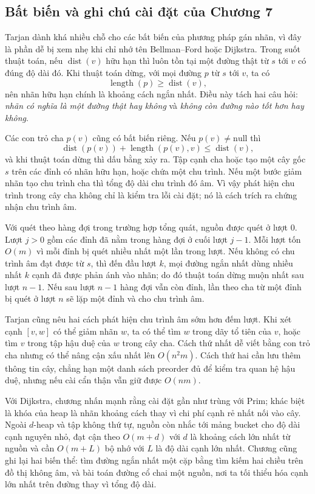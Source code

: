 \documentclass[11pt]{article}
\begin{document}
\subsection*{Bất biến và ghi chú cài đặt của Chương 7}

Tarjan dành khá nhiều chỗ cho các bất biến của phương pháp gán nhãn, vì đây là
phần dễ bị xem nhẹ khi chỉ nhớ tên Bellman--Ford hoặc Dijkstra. Trong suốt thuật
toán, nếu \(\operatorname{dist}(v)\) hữu hạn thì luôn tồn tại một đường thật từ
\(s\) tới \(v\) có đúng độ dài đó. Khi thuật toán dừng, với mọi đường \(p\) từ
\(s\) tới \(v\), ta có
\[
  \operatorname{length}(p)\ge \operatorname{dist}(v),
\]
nên nhãn hữu hạn chính là khoảng cách ngắn nhất. Điều này tách hai câu hỏi:
\emph{nhãn có nghĩa là một đường thật hay không} và \emph{không còn đường nào
tốt hơn hay không}.

Các con trỏ cha \(p(v)\) cũng có bất biến riêng. Nếu \(p(v)\ne\mathrm{null}\)
thì
\[
  \operatorname{dist}(p(v))+\operatorname{length}(p(v),v)
  \le \operatorname{dist}(v),
\]
và khi thuật toán dừng thì dấu bằng xảy ra. Tập cạnh cha hoặc tạo một cây gốc
\(s\) trên các đỉnh có nhãn hữu hạn, hoặc chứa một chu trình. Nếu một bước giảm
nhãn tạo chu trình cha thì tổng độ dài chu trình đó âm. Vì vậy phát hiện chu
trình trong cây cha không chỉ là kiểm tra lỗi cài đặt; nó là cách trích ra chứng
nhận chu trình âm.

Với quét theo hàng đợi trong trường hợp tổng quát, nguồn được quét ở lượt 0.
Lượt \(j>0\) gồm các đỉnh đã nằm trong hàng đợi ở cuối lượt \(j-1\). Mỗi lượt
tốn \(O(m)\) vì mỗi đỉnh bị quét nhiều nhất một lần trong lượt. Nếu không có
chu trình âm đạt được từ \(s\), thì đến đầu lượt \(k\), mọi đường ngắn nhất dùng
nhiều nhất \(k\) cạnh đã được phản ánh vào nhãn; do đó thuật toán dừng muộn nhất
sau lượt \(n-1\). Nếu sau lượt \(n-1\) hàng đợi vẫn còn đỉnh, lần theo cha từ
một đỉnh bị quét ở lượt \(n\) sẽ lặp một đỉnh và cho chu trình âm.

Tarjan cũng nêu hai cách phát hiện chu trình âm sớm hơn đếm lượt. Khi xét cạnh
\([v,w]\) có thể giảm nhãn \(w\), ta có thể tìm \(w\) trong dãy tổ tiên của
\(v\), hoặc tìm \(v\) trong tập hậu duệ của \(w\) trong cây cha. Cách thứ nhất
dễ viết bằng con trỏ cha nhưng có thể nâng cận xấu nhất lên \(O(n^2m)\). Cách
thứ hai cần lưu thêm thông tin cây, chẳng hạn một danh sách preorder đủ để kiểm
tra quan hệ hậu duệ, nhưng nếu cài cẩn thận vẫn giữ được \(O(nm)\).

Với Dijkstra, chương nhấn mạnh rằng cài đặt gần như trùng với Prim; khác biệt
là khóa của heap là nhãn khoảng cách thay vì chi phí cạnh rẻ nhất nối vào cây.
Ngoài \(d\)-heap và tập không thứ tự, nguồn còn nhắc tới mảng bucket cho độ dài
cạnh nguyên nhỏ, đạt cận theo \(O(m+d)\) với \(d\) là khoảng cách lớn nhất từ
nguồn và cần \(O(m+L)\) bộ nhớ với \(L\) là độ dài cạnh lớn nhất. Chương cũng
ghi lại hai biến thể: tìm đường ngắn nhất một cặp bằng tìm kiếm hai chiều trên
đồ thị không âm, và bài toán đường cổ chai một nguồn, nơi ta tối thiểu hóa cạnh
lớn nhất trên đường thay vì tổng độ dài.
\end{document}
